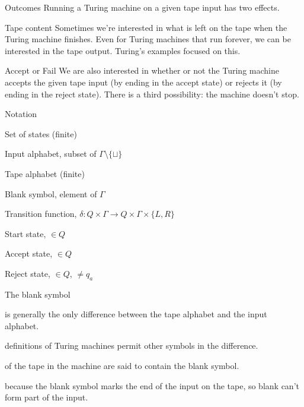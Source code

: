\begin{frame}{Outcomes}
  Running a Turing machine on a given tape input has two effects.

  \begin{alertblock}{Tape content}
    Sometimes we're interested in what is left on the tape when the Turing machine finishes. Even for Turing machines that run forever, we can be interested in the tape output. Turing's examples focused on this.
  \end{alertblock}

  \begin{alertblock}{Accept or Fail}
    We are also interested in whether or not the Turing machine accepts the given tape input (by ending in the accept state) or rejects it (by ending in the reject state). There is a third possibility: the machine doesn't stop.
  \end{alertblock}
\end{frame}


\begin{frame}{Notation}
  \begin{description}[aaaaaaaa]
    \item[$Q$] Set of states (finite)
    \item[$\Sigma$] Input alphabet, subset of $\Gamma \setminus \{ \sqcup \} $
    \item[$\Gamma$] Tape alphabet (finite)
    \item[$\sqcup$] Blank symbol, element of $\Gamma$
    \item[$\delta$] Transition function, $\delta: Q \times \Gamma \rightarrow Q \times \Gamma \times \{L,R\}$
    \item[$q_0$] Start state, $\in Q$
    \item[$q_a$] Accept state, $\in Q$
    \item[$q_r$] Reject state, $\in Q$, $\neq q_a$
  \end{description}
\end{frame}


\begin{frame}{The blank symbol}
  \begin{description}
    \setlength\itemsep{4mm}
    \item[\bl] is generally the only difference between the tape alphabet and the input alphabet.
    \item[Some] definitions of Turing machines permit other symbols in the difference.
    \item[Empty cells] of the tape in the machine are said to contain the blank symbol.
    \item[Important] because the blank symbol marks the end of the input on the tape, so blank can't form part of the input.
  \end{description}
\end{frame}


